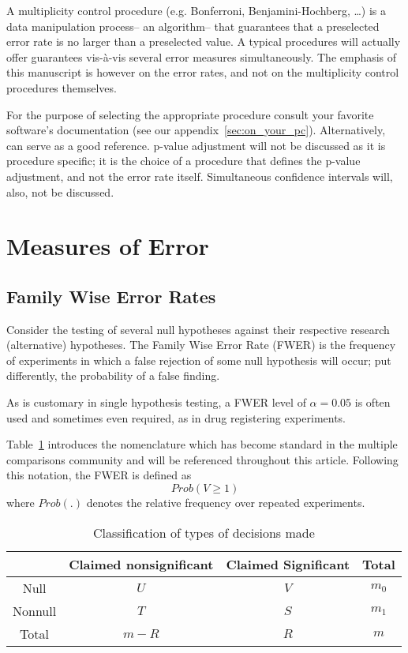 \documentclass[review,12pt]{article}
\theoremstyle{definition}
\begin{document}
A multiplicity control procedure (e.g. Bonferroni, Benjamini-Hochberg, \dots) is a data manipulation process-- an algorithm-- that guarantees that a preselected error rate is no larger than a preselected value. A typical procedures will actually offer guarantees vis-\`a-vis several error measures simultaneously. The emphasis of this manuscript is however on the error rates, and not on the multiplicity control procedures themselves. 


For the purpose of selecting the appropriate procedure consult your favorite software's documentation (see our appendix~\ref{sec:on_your_pc}). Alternatively, \citet{farcomeni_review_2008} can serve as a good reference. 
p-value adjustment will not be discussed as it is procedure specific; it is the choice of a procedure that defines the p-value adjustment, and not the error rate itself.
Simultaneous confidence intervals will, also, not be discussed.  


\section{\label{sec:measures_of_error}Measures of Error}

\subsection{Family Wise Error Rates}
Consider the testing of several null hypotheses against their respective research (alternative) hypotheses. The Family Wise Error Rate (FWER) is the frequency of experiments in which a false rejection of some null hypothesis will occur; put differently, the probability of a false finding.

As is customary in single hypothesis testing, a FWER level of $\alpha=0.05$ is often used and sometimes even required, as in drug registering experiments.




Table~\ref{tab:event_notation} introduces the nomenclature which has become standard in the multiple comparisons community and will be referenced throughout this article. Following this notation, the FWER is defined as $$Prob(V \geq 1 )$$ where $Prob(.)$ denotes the relative frequency over repeated experiments.



\begin{table}[h]
  \centering
\begin{tabular}{|c|c|c|c|}
\hline \rule[-1ex]{0pt}{1.5ex} & Claimed nonsignificant & Claimed Significant & Total \\ 
\hline
\hline \rule[-1ex]{0pt}{1.5ex} Null & $U$ & $V$ & $m_0$ \\ 
\hline \rule[-1ex]{0pt}{1.5ex} Nonnull & $T$ & $S$ & $m_1$ \\ 
\hline \rule[-1ex]{0pt}{1.5ex} Total & $m-R$ & $R$ & $m$ \\ 
\hline 
\end{tabular} 
  \caption{Classification of types of decisions made}
  \label{tab:event_notation}
\end{table}
\end{document}

